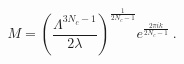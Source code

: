 \begin{equation}
\label{ML2}
M=\left(\frac{\Lambda^{3N_c-1}}{2 \lambda} \right)^{\frac{1}{2N_c-1}} 
e^{\frac{2 \pi i k}{2N_c-1}} ~.
\end{equation}

